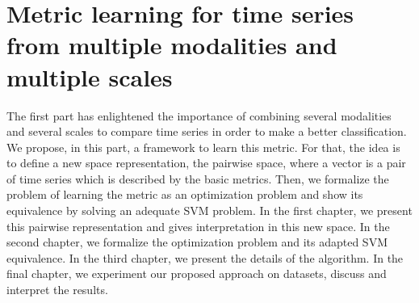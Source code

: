 \part{Metric learning for time series from multiple modalities and multiple scales}
The first part has enlightened the importance of combining several modalities and several scales to compare time series in order to make a better classification. We propose, in this part, a framework to learn this metric. For that, the idea is to define a new space representation, the pairwise space, where a vector is a pair of time series which is described by the basic metrics. Then, we formalize the problem of learning the metric as an optimization problem and show its equivalence by solving an adequate SVM problem. In the first chapter, we present this pairwise representation and gives interpretation in this new space. In the second chapter, we formalize the optimization problem and its adapted SVM equivalence. In the third chapter, we present the details of the algorithm. In the final chapter, we experiment our proposed approach on datasets, discuss and interpret the results.

